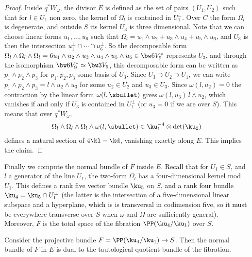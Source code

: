 \begin{proof}
Inside $q^*W_\omega$, the divisor $E$ is defined as the set of pairs $(U_1,U_2)$ such that
for $l\in U_1$ non zero, the kernel
of $\Omega_l$ is contained in $U_1^\perp$. Over $C$ the form $\Omega_l$ is degenerate, and outside
$S$ its kernel $U_3$ is three dimensional. Note that we can choose linear forms $u_1,\ldots ,u_6$
such that $\Omega_l=u_1\wedge u_2+u_3\wedge u_4+u_5\wedge u_6$, and $U_3$ is then the intersection $u_1^\perp\cap\cdots \cap u_6^\perp$. So the decomposable form $\Omega_l\wedge \Omega_l\wedge \Omega_l = 6u_1\wedge u_2\wedge u_3\wedge u_4\wedge u_5\wedge u_6\in\bw6V_9^*$ represents $U_3$, and
through the isomorphism $\bw6V_9^*\simeq \bw3V_9$, this decomposable
form can be written as $p_1\wedge p_2\wedge p_3$ for $p_1, p_2, p_3$ some basis of $U_3$.
Since $U_3\supset U_2\supset U_1$, we can write
$p_1\wedge p_2\wedge p_3=l\wedge u_2\wedge u_3$ for some $u_2\in U_2$ and $u_3\in U_3$. Since $\omega(l,u_2)=0$ the contraction
by the linear form $\omega(l,\sbullet)$ gives $\omega(l,u_3)\, l\wedge u_2$, which vanishes if
and only if $U_3$ is contained in $U_1^\perp$ (or $u_3=0$ if we are over $S$).
This means that over $q^*W_\omega$,
\[
\Omega_l\wedge \Omega_l\wedge \Omega_l\wedge\omega(l,\sbullet)\in \ku_1^{-4}\otimes \det(\ku_2)
\] defines a natural section of $4\kl-\kd$, vanishing exactly along $E$.
This implies the claim.
\end{proof}

Finally we compute the normal bundle of $F$ inside $E$. Recall that for $U_1\in S$, and~$l$ a generator of the line $U_1$, the two-form $\Omega_l$ has a four-dimensional kernel mod $U_1$. This defines a rank five vector bundle $\ku_5$ on $S$, and a rank four bundle $\ku_4=\ku_5
\cap U_1^\perp$ (the latter is the intersection of a five-dimensional linear subspace and a hyperplane, which is
is transversal in codimension five, so it must be everywhere transverse over $S$ when $\omega$ and $\Omega $ are sufficiently
general). Moreover, $F$ is the total space of the fibration $\PP (\ku_4/\ku_1)$ over $S$.

\begin{lemma}\label{normalF}
Consider the projective bundle $F=\PP (\ku_4/\ku_1)\to S$. Then
the normal bundle of $F$ in $E$ is dual to the tautological quotient
bundle of the fibration.
\end{lemma}

